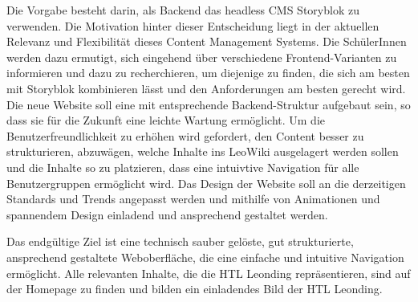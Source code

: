 Die Vorgabe besteht darin, als Backend das headless CMS Storyblok zu verwenden. Die Motivation hinter dieser Entscheidung 
liegt in der aktuellen Relevanz und Flexibilität dieses Content Management Systems. Die SchülerInnen werden dazu ermutigt, 
sich eingehend über verschiedene Frontend-Varianten zu informieren und dazu zu recherchieren, um diejenige zu finden, 
die sich am besten mit Storyblok kombinieren lässt und den Anforderungen am besten gerecht wird.
Die neue Website soll eine mit entsprechende Backend-Struktur aufgebaut sein, so dass
sie für die Zukunft eine leichte Wartung ermöglicht. 
Um die Benutzerfreundlichkeit zu erhöhen wird gefordert, den Content besser zu strukturieren,
abzuwägen, welche Inhalte ins LeoWiki ausgelagert werden sollen und die Inhalte so zu 
platzieren, dass eine intuivtive Navigation für alle Benutzergruppen ermöglicht wird.
Das Design der Website soll an die derzeitigen Standards und Trends angepasst werden
und mithilfe von Animationen und spannendem Design einladend und ansprechend gestaltet werden.

Das endgültige Ziel ist eine technisch sauber gelöste, gut strukturierte, ansprechend gestaltete
Weboberfläche, die eine einfache und intuitive Navigation ermöglicht. Alle relevanten Inhalte, die die HTL Leonding repräsentieren,
sind auf der Homepage zu finden und bilden ein einladendes Bild der HTL Leonding. 